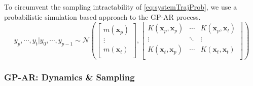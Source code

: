 To circumvent the sampling intractability of \cref{eq:systemTrajProb}, we use a probabilistic simulation based approach 
to the GP-AR process.
%
\begin{equation}\label{eq:systemTrajProb}
    y_{p}, \cdots, y_{t} \rvert y_{0}, \cdots, y_{p-1} \sim \mathcal{N}
    \left( 
        \begin{bmatrix}
            m(\mathbf{x}_{p})\\ 
            \vdots\\ 
            m(\mathbf{x}_{t})\\ 
        \end{bmatrix},
        \begin{bmatrix}
          K(\mathbf{x}_p, \mathbf{x}_p) & \cdots & K(\mathbf{x}_p, \mathbf{x}_t) \\
          \vdots & \ddots & \vdots \\
          K(\mathbf{x}_t, \mathbf{x}_p) & \cdots & K(\mathbf{x}_t, \mathbf{x}_t)\\
        \end{bmatrix}  
    \right) 
\end{equation}


\subsubsection*{GP-AR: Dynamics \& Sampling}



